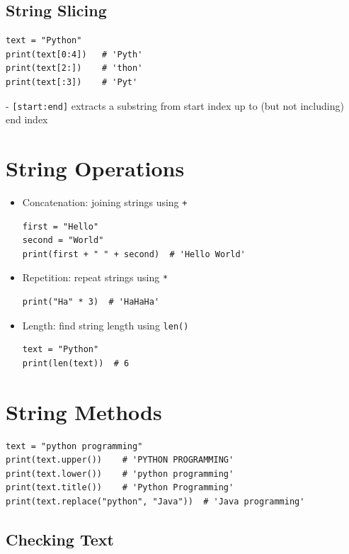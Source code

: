 \subsection{String Slicing}

\begin{verbatim}
text = "Python"
print(text[0:4])   # 'Pyth'
print(text[2:])    # 'thon'
print(text[:3])    # 'Pyt'
\end{verbatim}

- \texttt{[start:end]} extracts a substring from start index up to (but not including) end index  

\section{String Operations}

\begin{itemize}
    \item Concatenation: joining strings using \texttt{+}  

\begin{verbatim}
first = "Hello"
second = "World"
print(first + " " + second)  # 'Hello World'
\end{verbatim}

    \item Repetition: repeat strings using \texttt{*}  

\begin{verbatim}
print("Ha" * 3)  # 'HaHaHa'
\end{verbatim}

    \item Length: find string length using \texttt{len()}  

\begin{verbatim}
text = "Python"
print(len(text))  # 6
\end{verbatim}
\end{itemize}

\section{String Methods}

\begin{verbatim}
text = "python programming"
print(text.upper())    # 'PYTHON PROGRAMMING'
print(text.lower())    # 'python programming'
print(text.title())    # 'Python Programming'
print(text.replace("python", "Java"))  # 'Java programming'
\end{verbatim}

\subsection{Checking Text}

